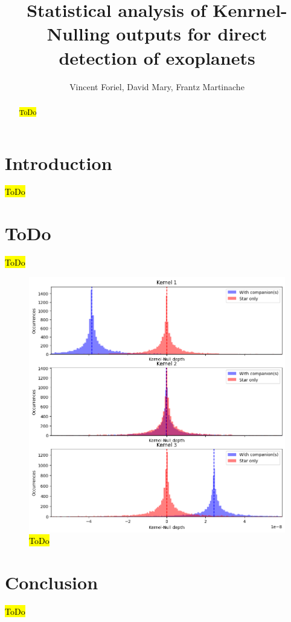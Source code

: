 \documentclass{article}
\title{Statistical analysis of Kenrnel-Nulling outputs for direct detection of exoplanets}
\author{Vincent Foriel, David Mary, Frantz Martinache}
\begin{document}
\maketitle

\begin{abstract}
\hl{ToDo}
\end{abstract}


\section{Introduction}
\hl{ToDo}

\section{ToDo}
\hl{ToDo}

\begin{figure}
\centering
\includegraphics[width=0.25\linewidth]{img/output_distribution.png}
\caption{\label{fig:distribution}\hl{ToDo}}
\end{figure}

\section{Conclusion}
\hl{ToDo}



\end{document}
